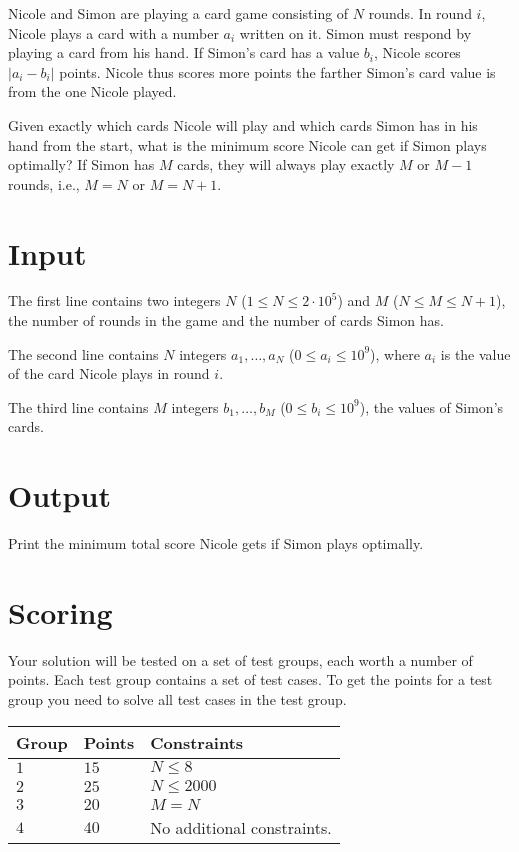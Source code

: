 \noindent
Nicole and Simon are playing a card game consisting of $N$ rounds.
In round $i$, Nicole plays a card with a number $a_i$ written on it.
Simon must respond by playing a card from his hand.
If Simon's card has a value $b_i$, Nicole scores $|a_i - b_i|$ points.
Nicole thus scores more points the farther Simon's card value is from the one Nicole played.

Given exactly which cards Nicole will play and which cards Simon has in his hand from the start, what is the minimum score Nicole can get if Simon plays optimally?
If Simon has $M$ cards, they will always play exactly $M$ or $M - 1$ rounds, i.e., $M = N$ or $M = N + 1$.

\section*{Input}
The first line contains two integers $N$ ($1 \leq N \leq 2 \cdot 10^5$) and $M$ ($N \leq M \leq N+1$), the number of rounds in the game and the number of cards Simon has.

The second line contains $N$ integers $a_1, \dots, a_N$ ($0 \le a_i \le 10^9$), where $a_i$ is the value of the card Nicole plays in round $i$.

The third line contains $M$ integers $b_1, \dots, b_M$ ($0 \le b_i \le 10^9$), the values of Simon's cards.

\section*{Output}
Print the minimum total score Nicole gets if Simon plays optimally.

\section*{Scoring}
Your solution will be tested on a set of test groups, each worth a number of points. Each test group contains
a set of test cases. To get the points for a test group you need to solve all test cases in the test group.

\noindent
\begin{tabular}{| l | l | l |}
  \hline
  \textbf{Group} & \textbf{Points} & \textbf{Constraints} \\ \hline
  $1$   & $15$       & $N \leq 8 $\\ \hline
  $2$   & $25$       & $N \leq 2000 $  \\ \hline
  $3$   & $20$       & $M=N$ \\ \hline
  $4$   & $40$       & No additional constraints. \\ \hline
\end{tabular}

